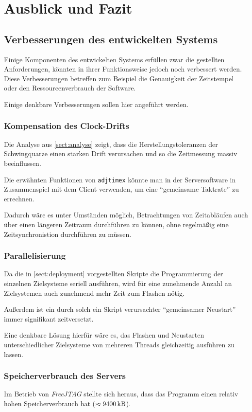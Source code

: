 \chapter{Ausblick und Fazit}\label{chap:ausblick}
\minitoc
\section{Verbesserungen des entwickelten Systems}
Einige Komponenten des entwickelten Systems erfüllen zwar die gestellten
Anforderungen, könnten in ihrer Funktionsweise jedoch noch verbessert werden.
Diese Verbesserungen betreffen zum Beispiel die Genauigkeit der Zeitstempel oder
den Ressourcenverbrauch der Software.

Einige denkbare Verbesserungen sollen hier angeführt werden.
\subsection{Kompensation des Clock-Drifts}
Die Analyse aus \autoref{sect:analyse} zeigt, dass die Herstellungstoleranzen
der Schwingquarze einen starken Drift verursachen und so die Zeitmessung massiv
beeinflussen.

Die erwähnten Funktionen von \texttt{adjtimex} könnte man in der Serversoftware
in Zusammenspiel mit dem Client verwenden, um eine "`gemeinsame Taktrate"' zu
errechnen. 

Dadurch wäre es unter Umständen möglich, Betrachtungen von Zeitabläufen auch
über einen längeren Zeitraum durchführen zu können, ohne regelmäßig eine
Zeitsynchronistion durchführen zu müssen.
\subsection{Parallelisierung}
Da die in \autoref{sect:deployment} vorgestellten Skripte die Programmierung der
einzelnen Zielsysteme seriell ausführen, wird für eine zunehmende Anzahl an
Zielsystemen auch zunehmend mehr Zeit zum Flashen nötig.

Außerdem ist ein durch solch ein Skript verursachter "`gemeinsamer Neustart"'
immer signifikant zeitversetzt.

Eine denkbare Lösung hierfür wäre es, das Flashen und Neustarten
unterschiedlicher Zielsysteme von mehreren Threads gleichzeitig ausführen zu
lassen.
\subsection{Speicherverbrauch des Servers}
Im Betrieb von \emph{FreeJTAG} stellte sich heraus, dass das Programm einen
relativ hohen Speicherverbrauch hat ($\approx \SI{9400}{\kilo\byte}$). 

